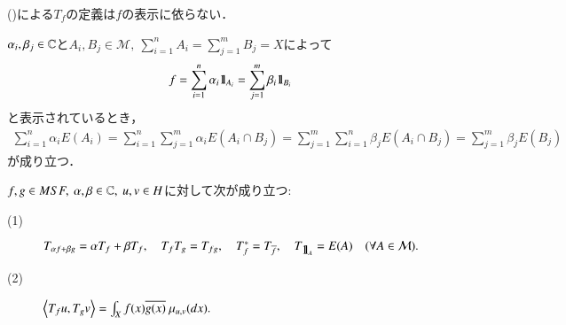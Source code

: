	\begin{screen}
		\begin{lem}
			()による$T_f$の定義は$f$の表示に依らない．
		\end{lem}	
	\end{screen}
	
	\begin{prf}
			$\alpha_i ,\beta_j \in \mathbb{C}$と$A_i,B_j \in \mathcal{M},\ \sum_{i=1}^{n} A_i = \sum_{j=1}^{m} B_j = X$によって
			\begin{align}
				f = \sum_{i=1}^{n} \alpha_i \mbox{1}\hspace{-0.25em}\mbox{l}_{A_i} = \sum_{j=1}^{m} \beta_i \mbox{1}\hspace{-0.25em}\mbox{l}_{B_i}
			\end{align}
			と表示されているとき，
			\begin{align}
				\sum_{i=1}^{n} \alpha_i E(A_i)
				= \sum_{i=1}^{n} \sum_{j=1}^{m} \alpha_i E(A_i \cap B_j)
				= \sum_{j=1}^{m} \sum_{i=1}^{n} \beta_j E(A_i \cap B_j)
				= \sum_{j=1}^{m} \beta_j E(B_j)
			\end{align}
			が成り立つ．
		\QED
	\end{prf}
	
	\begin{screen}
		\begin{lem}
			$f,g \in MSF,\ \alpha,\beta \in \mathbb{C},\ u,v \in H$に対して次が成り立つ:
			\begin{description}
				\item[(1)] 
					$T_{\alpha f + \beta g} = \alpha T_f + \beta T_f,
						\quad T_f T_g = T_{fg},
						\quad T_f^* = T_{\overline{f}},
						\quad T_{\mbox{1}\hspace{-0.25em}\mbox{l}_A} = E(A) \quad (\forall A \in \mathcal{M}).$
				
				\item[(2)] 
					$\inprod<T_f u, T_g v> = \int_X f(x) \conj{g(x)}\ \mu_{u,v}(dx).$
			\end{description}
			\label{lem:MSF_properties_of_T_f}
		\end{lem}
	\end{screen}
	

